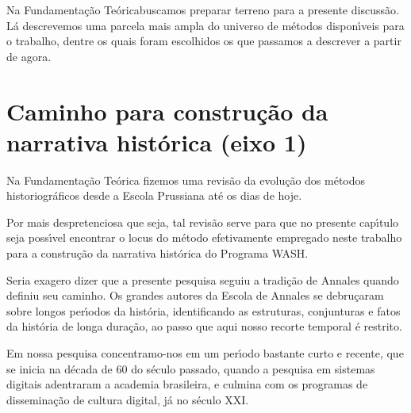 \documentclass[
12pt,		%
openright,	%
twoside,  %
a4paper,			%
chapter=TITLE,		%
english,			%
french,				%
spanish,			%
brazil				%
]{USPSC-classe/USPSC}
\begin{document}
Na \textquotedbl Fundamenta\c{c}\~ao Te\'orica\textquotedbl  buscamos preparar terreno para a presente discuss\~ao. L\'a descrevemos uma parcela mais ampla do universo de m\'etodos dispon\'{\i}veis para o trabalho, dentre os quais foram escolhidos os que passamos a descrever a partir de agora.









\section[Caminho para constru\c{c}\~ao da narrativa hist\'orica (eixo 1)]{Caminho para constru\c{c}\~ao da narrativa hist\'orica (eixo 1)}\label{Caminho para constru\c{c}\~ao da narrativa hist\'orica (eixo 1)}
Na Fundamenta\c{c}\~ao Te\'orica fizemos uma revis\~ao da evolu\c{c}\~ao dos m\'etodos historiogr\'aficos desde a Escola Prussiana at\'e os dias de hoje.









Por mais despretenciosa que seja, tal revis\~ao serve para que no presente cap\'{\i}tulo seja poss\'{\i}vel encontrar o locus do m\'etodo efetivamente empregado neste trabalho para a constru\c{c}\~ao da narrativa hist\'orica do Programa WASH.









Seria exagero dizer que a presente pesquisa seguiu a tradi\c{c}\~ao de Annales quando definiu seu caminho.  Os grandes autores da Escola de Annales se debru\c{c}aram sobre longos per\'{\i}odos da hist\'oria, identificando as estruturas, conjunturas e fatos da \textquotedbl hist\'oria de longa dura\c{c}\~ao\textquotedbl , ao passo que aqui nosso recorte temporal \'e restrito.









Em nossa pesquisa concentramo-nos em um per\'{\i}odo bastante curto e recente, que se inicia na d\'ecada de 60 do s\'eculo passado, quando a pesquisa em sistemas digitais adentraram a academia brasileira, e culmina com os programas de dissemina\c{c}\~ao de cultura digital, j\'a no s\'eculo XXI.
\end{document}
